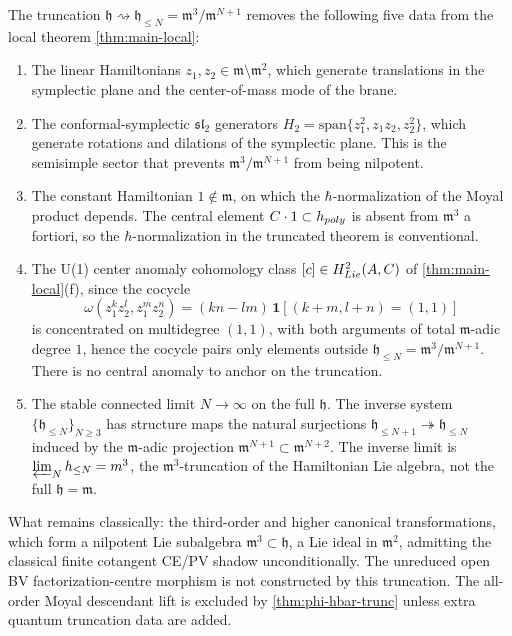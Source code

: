 \begin{prop}\label{prop:trunc-lost-sectors}
The truncation $\mathfrak h\rightsquigarrow\mathfrak h_{\leq N}=
\mathfrak m^3/\mathfrak m^{N+1}$ removes the following five
data from the local theorem \ref{thm:main-local}:
\begin{enumerate}
  \item\label{lost:translations}
    The linear Hamiltonians $z_1,z_2\in\mathfrak m\setminus\mathfrak m^2$,
    which generate translations in the symplectic plane and the
    center-of-mass mode of the brane.
  \item\label{lost:sl2}
    The conformal-symplectic $\mathfrak{sl}_2$ generators
    $H_2=\mathrm{span}\{z_1^2,z_1z_2,z_2^2\}$, which generate
    rotations and dilations of the symplectic plane. This is the
    semisimple sector that prevents $\mathfrak m^3/\mathfrak m^{N+1}$
    from being nilpotent.
  \item\label{lost:constants}
    The constant Hamiltonian $1\notin\mathfrak m$, on which the
    $\hbar$-normalization of the Moyal product depends. The
    central element $\C\cdot 1\subset\mathfrak h_{\mathrm{poly}}$
    is absent from $\mathfrak m^3$ a fortiori, so the
    $\hbar$-normalization in the truncated theorem is conventional.
  \item\label{lost:u1-anomaly}
    The U(1) center anomaly cohomology class
    $[\bar c]\in H^2_{\mathrm{Lie}}(\bar A,\C)$ of
    \ref{thm:main-local}(f), since the cocycle
    $$\omega(z_1^kz_2^l,z_1^mz_2^n)=(kn-lm)\,
       \mathbf 1[(k+m,l+n)=(1,1)]$$
    is concentrated on multidegree $(1,1)$, with both arguments of
    total $\mathfrak m$-adic degree $1$, hence the cocycle pairs
    only elements outside $\mathfrak h_{\leq N}=\mathfrak m^3/
    \mathfrak m^{N+1}$. There is no central anomaly to anchor on
    the truncation.
  \item\label{lost:colim}
    The stable connected limit $N\to\infty$ on the full
    $\mathfrak h$. The inverse system
    $\{\mathfrak h_{\leq N}\}_{N\geq 3}$ has structure maps the
    natural surjections
    $\mathfrak h_{\leq N+1}\twoheadrightarrow\mathfrak h_{\leq N}$
    induced by the $\mathfrak m$-adic projection
    $\mathfrak m^{N+1}\subset\mathfrak m^{N+2}$. The inverse limit
    is $\varprojlim_N\mathfrak h_{\leq N}=\mathfrak m^3$, the
    $\mathfrak m^3$-truncation of the Hamiltonian Lie algebra, not
    the full $\mathfrak h=\mathfrak m$.
\end{enumerate}
What remains classically: the third-order and higher canonical
transformations, which form a nilpotent Lie subalgebra
$\mathfrak m^3\subset\mathfrak h$, a Lie ideal in $\mathfrak m^2$,
admitting the classical finite cotangent CE/PV shadow unconditionally.
The unreduced open BV factorization-centre morphism is not constructed
by this truncation. The all-order Moyal descendant lift is excluded by
\ref{thm:phi-hbar-trunc} unless extra quantum truncation data are
added.
\end{prop}

